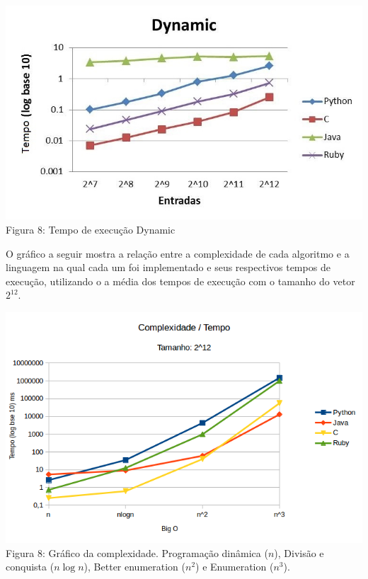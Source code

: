 \documentclass[
	12pt,				%
	oneside,   	        %
	a4paper,			%
	english,			%
	french,				%
	spanish,			%
	brazil,				%
	]{pacotes/abntex2}
\begin{document}
\begin{center}
    \includegraphics[scale=0.9]{figuras/dynamic.jpg} \\
    \caption{Figura 8: Tempo de execução Dynamic}
\end{center}


O gráfico a seguir mostra a relação entre a complexidade de cada algoritmo e a linguagem na qual cada um foi implementado e seus respectivos tempos de execução, utilizando o a média dos tempos de execução com o tamanho do vetor $2^{12}$.

\begin{center}
    \includegraphics[scale=0.9]{figuras/comp.png} \\
    \caption{Figura 8: Gráfico da complexidade. Programação dinâmica ($n$), Divisão e conquista ($n\log{n}$), Better enumeration ($n^2$) e Enumeration ($n^3$).}
\end{center}
\end{document}
